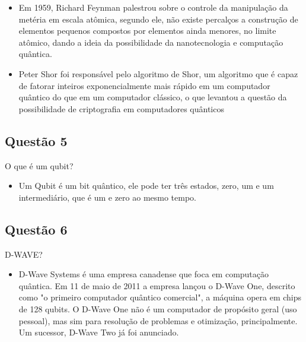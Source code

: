 \documentclass{article}
\begin{document}
        \begin{itemize}
        \item Em 1959, Richard Feynman palestrou sobre o controle da
            manipulação da metéria em escala atômica, segundo ele, não existe
                percalços a construção de elementos pequenos compostos por
                elementos ainda menores, no limite atômico, dando a ideia da
                possibilidade da nanotecnologia e computação quântica.
        \end{itemize}
        
        \begin{itemize}
        \item Peter Shor foi responsável pelo algoritmo de Shor, um algoritmo
            que é capaz de fatorar inteiros exponencialmente mais rápido em um
                computador quântico do que em um computador clássico, o que
                levantou a questão da possibilidade de criptografia em
                computadores quânticos
        \end{itemize}
        
\subsection*{Questão 5}
O que é um qubit?
        \begin{itemize}
        \item Um Qubit é um bit quântico, ele pode ter três estados, zero, um e
            um intermediário, que é um e zero ao mesmo tempo.
        \end{itemize}

\subsection*{Questão 6}
D-WAVE?
        \begin{itemize}
        \item D-Wave Systems é uma empresa canadense que foca em computação
            quântica. Em 11 de maio de 2011 a empresa lançou o D-Wave One,
                descrito como "o primeiro computador quântico comercial", a
                máquina opera em chips de 128 qubits. O D-Wave One não é um
                computador de propósito geral (uso pessoal), mas sim para
                resolução de problemas e otimização, principalmente. Um
                sucessor, D-Wave Two já foi anunciado. 
        \end{itemize}
\end{document}
